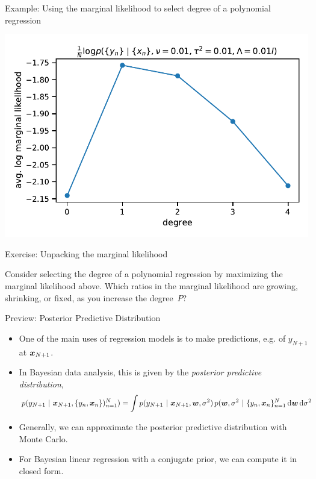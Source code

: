 \documentclass[aspectratio=169]{beamer}
\begin{document}
\begin{frame}{Example: Using the marginal likelihood to select degree of a polynomial regression}

\centering
\includegraphics[width=.66\linewidth]{figures/lap1/mll.pdf}
\end{frame}

\begin{frame}[t]{Exercise: Unpacking the marginal likelihood}

Consider selecting the degree of a polynomial regression by maximizing the marginal likelihood above. Which ratios in the marginal likelihood are growing, shrinking, or fixed, as you increase the degree~$P$?
    
\end{frame}

\begin{frame}{Preview: Posterior Predictive Distribution}
\begin{itemize}
\item One of the main uses of regression models is to make predictions, e.g. of $y_{N+1}$ at $\boldsymbol{x}_{N+1}$.

\item In Bayesian data analysis, this is given by the \textit{posterior predictive distribution},
\begin{align}
    p(y_{N+1} ~\vert~ \boldsymbol{x}_{N+1}, \{y_n, \boldsymbol{x}_n\})_{n=1}^N)
    &= \int p(y_{N+1} ~\vert~ \boldsymbol{x}_{N+1}, \boldsymbol{w}, \sigma^2) \, p(\boldsymbol{w}, \sigma^2 ~\vert~ \{y_{n}, \boldsymbol{x}_n\}_{n=1}^N \mathop{}\!\mathrm{d} \boldsymbol{w} \mathop{}\!\mathrm{d} \sigma^2
\end{align}

\item Generally, we can approximate the posterior predictive distribution with Monte Carlo.

\item For Bayesian linear regression with a conjugate prior, we can compute it in closed form.
\end{itemize}
\end{frame}
\end{document}
